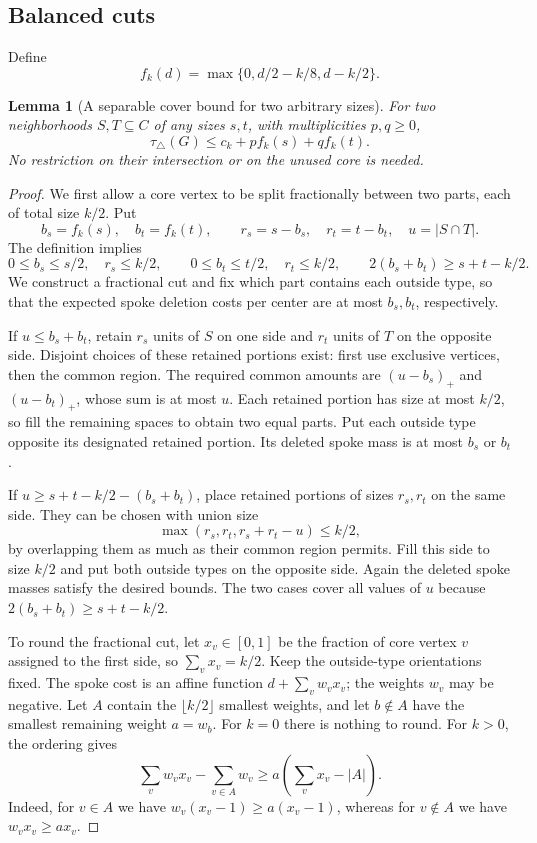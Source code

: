 \documentclass[11pt]{article}
\newtheorem{lemma}[theorem]{Lemma}
\newcommand{\tc}{\tau_{\triangle}}
\begin{document}
\subsection{Balanced cuts}
Define
\[
 f_k(d)=\max\{0,d/2-k/8,d-k/2\}.
\]

\begin{lemma}[A separable cover bound for two arbitrary sizes]
\label{lem:separable-cover}
For two neighborhoods $S,T\subseteq C$ of any sizes $s,t$, with
multiplicities $p,q\geq0$,
\[
 \boxed{\tc(G)\leq c_k+p f_k(s)+q f_k(t).}
\]
No restriction on their intersection or on the unused core is needed.
\end{lemma}
\begin{proof}
We first allow a core vertex to be split fractionally between two parts,
each of total size $k/2$. Put
\[
 b_s=f_k(s),\quad b_t=f_k(t),\qquad
 r_s=s-b_s,\quad r_t=t-b_t,\quad u=|S\cap T|.
\]
The definition implies
\[
 0\leq b_s\leq s/2,\quad r_s\leq k/2,
 \qquad 0\leq b_t\leq t/2,\quad r_t\leq k/2,
 \qquad 2(b_s+b_t)\geq s+t-k/2.
\]
We construct a fractional cut and fix which part contains each outside
type, so that the expected spoke deletion costs per center are at most
$b_s,b_t$, respectively.

If $u\leq b_s+b_t$, retain $r_s$ units of $S$ on one side and $r_t$
units of $T$ on the opposite side. Disjoint choices of these retained
portions exist: first use exclusive vertices, then the common region.
The required common amounts are $(u-b_s)_+$ and $(u-b_t)_+$, whose sum
is at most $u$. Each retained portion has size at most $k/2$, so fill
the remaining spaces to obtain two equal parts. Put each outside type
opposite its designated retained portion. Its deleted spoke mass is
at most $b_s$ or $b_t$.

If $u\geq s+t-k/2-(b_s+b_t)$, place retained portions of sizes
$r_s,r_t$ on the same side. They can be chosen with union size
\[
 \max(r_s,r_t,r_s+r_t-u)\leq k/2,
\]
by overlapping them as much as their common region permits. Fill this
side to size $k/2$ and put both outside types on the opposite side.
Again the deleted spoke masses satisfy the desired bounds.
The two cases cover all values of $u$ because
$2(b_s+b_t)\geq s+t-k/2$.

To round the fractional cut, let $x_v\in[0,1]$ be the fraction of core
vertex $v$ assigned to the first side, so $\sum_v x_v=k/2$.
Keep the outside-type orientations fixed. The spoke cost is an affine
function $d+\sum_v w_v x_v$; the weights $w_v$ may be negative.
Let $A$ contain the $\lfloor k/2\rfloor$ smallest weights, and let
$b\notin A$ have the smallest remaining weight $a=w_b$.
For $k=0$ there is nothing to round. For $k>0$, the ordering gives
\[
 \sum_v w_v x_v-\sum_{v\in A}w_v
 \geq a\left(\sum_v x_v-|A|\right).
\]
Indeed, for $v\in A$ we have
$w_v(x_v-1)\geq a(x_v-1)$, whereas for $v\notin A$ we have
$w_vx_v\geq ax_v$.


\end{proof}
\end{document}
